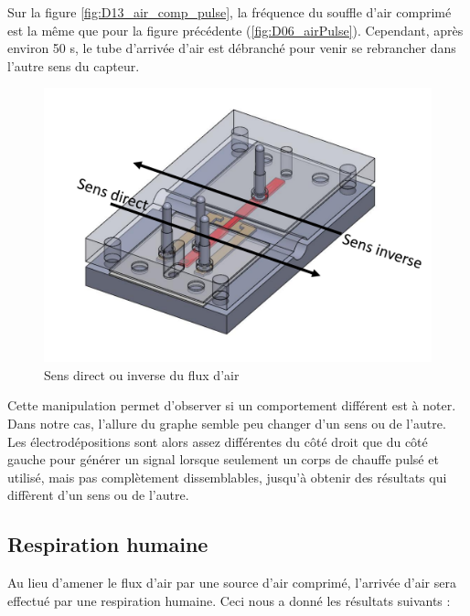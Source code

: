 Sur la figure \ref{fig:D13_air_comp_pulse}, la fréquence du souffle d'air comprimé est la même que pour la figure précédente 
(\ref{fig:D06_airPulse}). Cependant, après environ 50 s, le tube d'arrivée d'air est débranché pour venir se rebrancher dans l'autre sens 
du capteur. 

\begin{figure}[H]
    \centering
    \includegraphics[scale = 0.3]{assets/figures/Inverse_direct.pdf}
    \caption{Sens direct ou inverse du flux d'air}
    \label{fig:direct_inverse}
\end{figure}

Cette manipulation permet d'observer si un comportement différent est à noter. Dans notre cas, l'allure du graphe semble peu changer d'un sens 
ou de l'autre. Les électrodépositions sont alors assez différentes du côté droit que du côté gauche pour générer un signal lorsque seulement un 
corps de chauffe pulsé et utilisé, mais pas complètement dissemblables, jusqu'à obtenir des résultats qui diffèrent d'un sens ou de l'autre. 

\subsection{Respiration humaine}
Au lieu d'amener le flux d'air par une source d'air comprimé, l'arrivée d'air sera effectué par une respiration humaine. Ceci nous a donné les résultats suivants :

